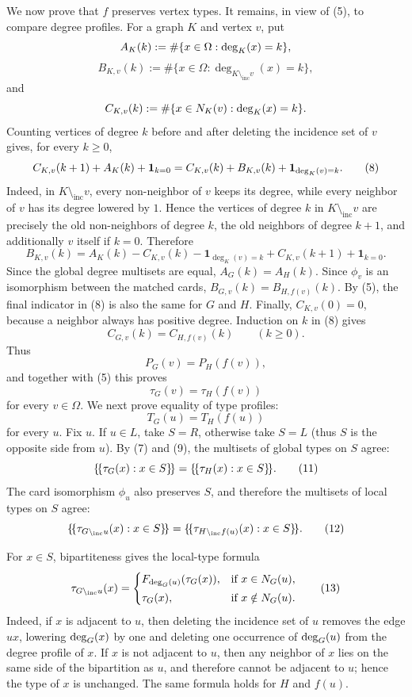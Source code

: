 We now prove that $f$ preserves vertex types. It remains, in view of (5), to
compare degree profiles. For a graph $K$ and vertex $v$, put
\[
A_K(k):=\#\{x\in\Omega:\deg_{K}(x)=k\},
\]
\[
B_{K,v}(k):=\#\{x\in\Omega:\deg_{K\setminus_{\mathrm{inc}} v}(x)=k\},
\]
and
\[
C_{K,v}(k):=\#\{x\in N_K(v):\deg_{K}(x)=k\}.
\]
Counting vertices of degree $k$ before and after deleting the incidence set of
$v$ gives, for every $k\ge 0$,
\[
C_{K,v}(k+1)+A_K(k)+\mathbf{1}_{k=0}
=
C_{K,v}(k)+B_{K,v}(k)+\mathbf{1}_{\deg_{K}(v)=k}.                           \tag{8}
\]
Indeed, in $K\setminus_{\mathrm{inc}} v$, every non-neighbor of $v$
keeps its degree, while every neighbor of $v$ has its degree lowered by
$1$.  Hence the vertices of degree $k$ in $K\setminus_{\mathrm{inc}} v$
are precisely the old non-neighbors of degree $k$, the old neighbors of
degree $k+1$, and additionally $v$ itself if $k=0$.  Therefore
\[
B_{K,v}(k)
=
A_K(k)-C_{K,v}(k)-\mathbf{1}_{\deg_K(v)=k}
+
C_{K,v}(k+1)
+
\mathbf{1}_{k=0}.
\]
Since the global
degree multisets are equal, $A_G(k)=A_H(k)$. Since $\phi_v$ is an isomorphism
between the matched cards, $B_{G,v}(k)=B_{H,f(v)}(k)$. By (5), the final
indicator in (8) is also the same for $G$ and $H$. Finally,
$C_{K,v}(0)=0$, because a neighbor always has positive degree. Induction on
$k$ in (8) gives
\[
C_{G,v}(k)=C_{H,f(v)}(k)\qquad(k\ge 0).
\]
Thus
\[
P_G(v)=P_H(f(v)),
\]
and together with (5) this proves
\[
\tau_G(v)=\tau_H(f(v))                                             \tag{9}
\]
for every $v\in\Omega$.
We next prove equality of type profiles:
\[
T_G(u)=T_H(f(u))                                                    \tag{10}
\]
for every $u$. Fix $u$. If $u\in L$, take $S=R$, otherwise take $S=L$ (thus $S$ is the
opposite side from $u$). By (7) and (9), the multisets of global types on $S$
agree:
\[
\{\!\{\tau_G(x):x\in S\}\!\}
=
\{\!\{\tau_H(x):x\in S\}\!\}.                                        \tag{11}
\]
The card isomorphism $\phi_u$ also preserves $S$, and therefore the multisets
of local types on $S$ agree:
\[
\{\!\{\tau_{G \setminus_{\mathrm{inc}} u}(x):x\in S\}\!\}
=
\{\!\{\tau_{H \setminus_{\mathrm{inc}} {f(u)}}(x):x\in S\}\!\}.                           \tag{12}
\]

For $x\in S$, bipartiteness gives the local-type formula
\[
\tau_{G \setminus_{\mathrm{inc}} u}(x)=
\begin{cases}
F_{\deg_{G}(u)}(\tau_G(x)), & \text{if } x\in N_G(u),\\[1mm]
\tau_G(x), & \text{if } x\notin N_G(u).
\end{cases}                                                          \tag{13}
\]
Indeed, if $x$ is adjacent to $u$, then deleting the incidence set of $u$
removes the edge $ux$, lowering $\deg_{G}(x)$ by one and deleting one occurrence
of $\deg_{G}(u)$ from the degree profile of $x$. If $x$ is not adjacent to $u$,
then any neighbor of $x$ lies on the same side of the bipartition as $u$, and
therefore cannot be adjacent to $u$; hence the type of $x$ is unchanged. The
same formula holds for $H$ and $f(u)$.

